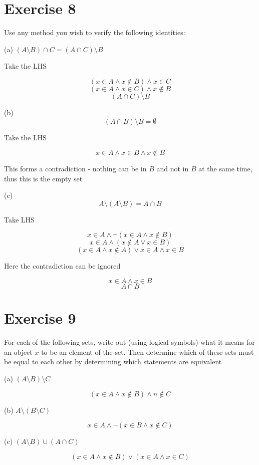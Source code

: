\documentclass[11pt]{article}
\begin{document}
\section*{Exercise 8}

Use any method you wish to verify the following identities:

\noindent (a) $(A \setminus B) \cap C = (A \cap C) \setminus B$

Take the LHS

$$(x \in A \wedge x \notin B) \wedge x \in C$$
$$(x \in A \wedge x \in C) \wedge x \notin B$$
$$(A \cap C) \setminus B$$

\noindent (b) $$(A \cap B) \setminus B = \emptyset$$

Take the LHS

$$x \in A \wedge x \in B \wedge x \notin B$$

This forms a contradiction - nothing can be in $B$ and not in $B$ at the same 
time, thus this is the empty set

\noindent (c) $$A \setminus (A \setminus B) = A \cap B$$

Take LHS

$$x \in A \wedge \neg (x \in A \wedge x \notin B)$$
$$x \in A \wedge (x \notin A \vee x \in B)$$
$$(x \in A \wedge x \notin A) \vee x \in A \wedge x \in B$$

Here the contradiction can be ignored

$$x \in A \wedge x \in B$$
$$A \cap B$$

\section*{Exercise 9}


For each of the following sets, write out (using logical symbols) what it means 
for an object $x$ to be an element of the set. Then determine which of these 
sets must be equal to each other by determining which statements are equivalent

\noindent (a) $(A \setminus B) \setminus C$

$$(x \in A \wedge x \notin B) \wedge n \notin C$$

\noindent (b) $A \setminus (B \setminus C)$

$$x \in A \wedge \neg (x \in B \wedge x \notin C)$$

\noindent (c) $(A \setminus B) \cup (A \cap C)$

$$(x \in A \wedge x \notin B) \vee (x \in A \wedge x \in C)$$
\end{document}
